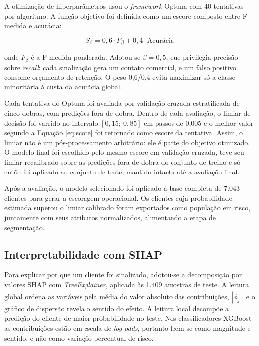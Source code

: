 \documentclass[12pt]{article}
\begin{document}
A otimização de hiperparâmetros usou o \textit{framework} Optuna
\cite{akiba2019} com 40 tentativas por algoritmo. A função objetivo foi
definida como um escore composto entre F-medida e acurácia:

\begin{equation}
S_{\beta} = 0{,}6 \cdot F_{\beta} + 0{,}4 \cdot \mbox{Acurácia}
\label{eq:score}
\end{equation}

\noindent onde $F_{\beta}$ é a F-medida ponderada. Adotou-se $\beta = 0{,}5$,
que privilegia precisão sobre \textit{recall}: cada sinalização gera um
contato comercial, e um falso positivo consome orçamento de retenção. O peso
0,6/0,4 evita maximizar só a classe minoritária à custa da acurácia global.

Cada tentativa do Optuna foi avaliada por validação cruzada estratificada de
cinco dobras, com predições fora de dobra. Dentro de cada avaliação, o limiar de
decisão foi varrido no intervalo $[0{,}15;\ 0{,}85]$ em passos de 0,005 e o
melhor valor segundo a Equação \ref{eq:score} foi retornado como escore da
tentativa. Assim, o limiar não é um pós-processamento arbitrário: ele é parte do
objetivo otimizado. O modelo final foi escolhido pelo mesmo escore em validação
cruzada, teve seu limiar recalibrado sobre as predições fora de dobra do
conjunto de treino e só então foi aplicado ao conjunto de teste, mantido intacto
até a avaliação final.

Após a avaliação, o modelo selecionado foi aplicado à base completa de 7.043
clientes para gerar a escoragem operacional. Os clientes cuja probabilidade
estimada superou o limiar calibrado foram exportados como população em risco,
juntamente com seus atributos normalizados, alimentando a etapa de segmentação.

\subsection{Interpretabilidade com SHAP}
\label{sub:shap}

Para explicar por que um cliente foi sinalizado, adotou-se a decomposição por
valores SHAP \cite{lundberg2017} com \textit{TreeExplainer}, aplicada às 1.409
amostras de teste. A leitura global ordena as variáveis pela média do valor
absoluto das contribuições, $\overline{|\phi_j|}$, e o gráfico de dispersão
revela o sentido do efeito. A leitura local decompõe a predição do cliente de
maior probabilidade no teste. Nos classificadores XGBoost as contribuições
estão em escala de \textit{log-odds}, portanto leem-se como magnitude e
sentido, e não como variação percentual de risco.
\end{document}
